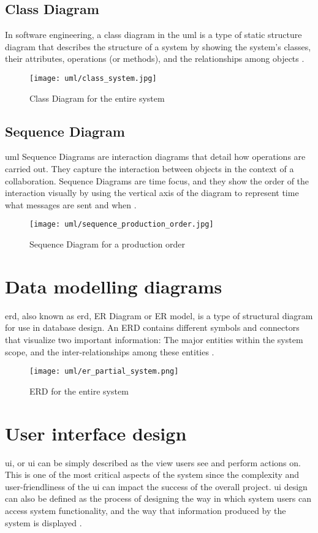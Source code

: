 \documentclass[12pt]{report}
\begin{document}
\newpage
\subsection{Class Diagram}
In software engineering, a class diagram in the \acrfull{uml} is a type of static structure diagram that describes the structure of a system by showing the system's classes, their attributes, operations (or methods), and the relationships among objects \cite{paradigm_2018_uml}.

\begin{figure}[H]
	\centering
	\texttt{[image: uml/class\_system.jpg]}
	\caption{Class Diagram for the entire system}
\end{figure}

\newpage
\subsection{Sequence Diagram}
\acrshort{uml} Sequence Diagrams are interaction diagrams that detail how operations are carried out. They capture the interaction between objects in the context of a collaboration. Sequence Diagrams are time focus, and they show the order of the interaction visually by using the vertical axis of the diagram to represent time what messages are sent and when \cite{paradigm_2018_uml}.

\begin{figure}[H]
	\centering
	\texttt{[image: uml/sequence\_production\_order.jpg]}
	\caption{Sequence Diagram for a production order}
\end{figure}

\section{Data modelling diagrams}
\acrlong{erd}, also known as \acrshort{erd}, ER Diagram or ER model, is a type of structural diagram for use in database design. An ERD contains different symbols and connectors that visualize two important information: The major entities within the system scope, and the inter-relationships among these entities \cite{paradigm_2018_uml}.

\begin{figure}[H]
	\centering
	\texttt{[image: uml/er\_partial\_system.png]}
	\caption{ERD for the entire system}
\end{figure}

\newpage
\section{User interface design}
\acrlong{ui}, or \acrshort{ui} can be simply described as the view users see and perform actions on. This is one of the most critical aspects of the system since the complexity and user-­friendliness of the \acrshort{ui} can impact the success of the overall project. \acrshort{ui} design can also be defined as the process of designing the way in which system users can access system functionality, and the way that information produced by the system is displayed \cite{sommerville_2008_software}.
\end{document}
